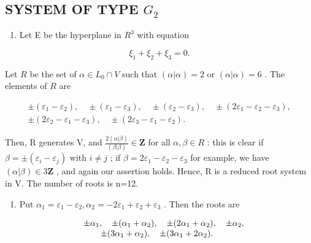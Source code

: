 \subsection{\texorpdfstring{SYSTEM OF TYPE \(G_{2}\)}{SYSTEM OF TYPE G\_2}}

\begin{enumerate}
\def\labelenumi{(\Roman{enumi})}
\tightlist
\item
  Let E be the hyperplane in \(R^{3}\) with equation
\end{enumerate}

\[
\xi_ {1} + \xi_ {2} + \xi_ {3} = 0.
\]

Let \(R\) be the set of \(\alpha \in L_0 \cap V\) such that \((\alpha | \alpha) = 2\) or \((\alpha | \alpha) = 6\) . The elements of \(R\) are

\[
\begin{array}{c} \pm (\varepsilon_ {1} - \varepsilon_ {2}), \quad \pm (\varepsilon_ {1} - \varepsilon_ {3}), \quad \pm (\varepsilon_ {2} - \varepsilon_ {3}), \quad \pm (2 \varepsilon_ {1} - \varepsilon_ {2} - \varepsilon_ {3}), \\ \pm (2 \varepsilon_ {2} - \varepsilon_ {1} - \varepsilon_ {3}), \quad \pm (2 \varepsilon_ {3} - \varepsilon_ {1} - \varepsilon_ {2}). \end{array}
\]

Then, R generates V, and \(\frac{2(\alpha|\beta)}{(\beta|\beta)}\in\mathbf{Z}\) for all \(\alpha,\beta\in R\) : this is clear if \(\beta=\pm(\varepsilon_{i}-\varepsilon_{j})\) with \(i\neq j\) ; if \(\beta=2\varepsilon_{1}-\varepsilon_{2}-\varepsilon_{3}\) for example, we have \((\alpha|\beta)\in3\mathbf{Z}\) , and again our assertion holds. Hence, R is a reduced root system in V. The number of roots is n=12.

\begin{enumerate}
\def\labelenumi{(\Roman{enumi})}
\setcounter{enumi}{1}
\tightlist
\item
  Put \(\alpha_{1} = \varepsilon_{1} - \varepsilon_{2},\alpha_{2} = -2\varepsilon_{1} + \varepsilon_{2} + \varepsilon_{3}\) . Then the roots are
\end{enumerate}

\[
\begin{array}{r l} & {\pm \alpha_ {1}, \quad \pm (\alpha_ {1} + \alpha_ {2}), \quad \pm (2 \alpha_ {1} + \alpha_ {2}), \quad \pm \alpha_ {2},} \\ & {\qquad \pm (3 \alpha_ {1} + \alpha_ {2}), \quad \pm (3 \alpha_ {1} + 2 \alpha_ {2}).} \end{array}
\]

